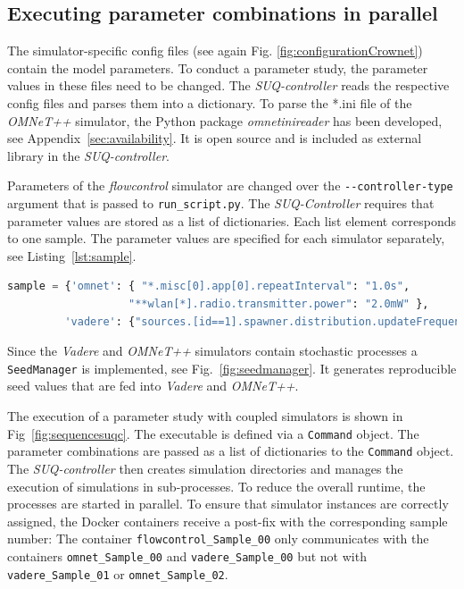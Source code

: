 \subsection{Executing parameter combinations in parallel}
The simulator-specific config files (see again Fig. \ref{fig:configurationCrownet}) contain the model parameters. To conduct a parameter study, the parameter values in these files need to be changed. The \textit{SUQ-controller} reads the respective config files and parses them into a dictionary. 
To parse the *.ini file of the \textit{OMNeT++} simulator, the Python package \textit{omnetinireader} has been developed, see Appendix~\ref{sec:availability}. It is open source and is included as external library in the \textit{SUQ-controller}. 

Parameters of the \textit{flowcontrol} simulator are changed over the \lstinline{--controller-type} argument that is passed to \lstinline{run_script.py}. The \textit{SUQ-Controller} requires that parameter values are stored as a list of dictionaries. Each list element corresponds to one sample. The parameter values are specified for each simulator separately, see Listing~\ref{lst:sample}. 


\begin{lstlisting}[caption={Sample definition (Python dictionary) in a coupled simulation.},language=Python, label=lst:sample]
sample = {'omnet': { "*.misc[0].app[0].repeatInterval": "1.0s",
                   "**wlan[*].radio.transmitter.power": "2.0mW" },
         'vadere': {"sources.[id==1].spawner.distribution.updateFrequency": 2.0}}
\end{lstlisting}

Since the \textit{Vadere} and \textit{OMNeT++} simulators contain stochastic processes a \lstinline{SeedManager} is implemented, see Fig.~\ref{fig:seedmanager}. It generates reproducible seed values that are fed into \textit{Vadere} and \textit{OMNeT++}. 

The execution of a parameter study with coupled simulators is shown in Fig~\ref{fig:sequencesuqc}. The executable is defined via a \lstinline{Command} object. The parameter combinations are passed as a list of dictionaries to the \lstinline{Command} object. The \textit{SUQ-controller} then creates simulation directories and manages the execution of simulations in sub-processes. To reduce the overall runtime, the processes are started in parallel. To ensure that simulator instances are correctly assigned, the Docker containers receive a post-fix with the corresponding sample number: The container \lstinline{flowcontrol_Sample_00} only communicates with the containers \lstinline{omnet_Sample_00} and \lstinline{vadere_Sample_00} but not with \lstinline{vadere_Sample_01} or \lstinline{omnet_Sample_02}.




